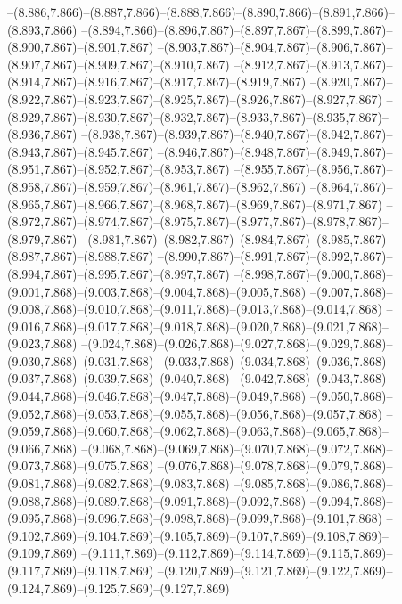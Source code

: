   --(8.886,7.866)--(8.887,7.866)--(8.888,7.866)--(8.890,7.866)--(8.891,7.866)--(8.893,7.866)%
  --(8.894,7.866)--(8.896,7.867)--(8.897,7.867)--(8.899,7.867)--(8.900,7.867)--(8.901,7.867)%
  --(8.903,7.867)--(8.904,7.867)--(8.906,7.867)--(8.907,7.867)--(8.909,7.867)--(8.910,7.867)%
  --(8.912,7.867)--(8.913,7.867)--(8.914,7.867)--(8.916,7.867)--(8.917,7.867)--(8.919,7.867)%
  --(8.920,7.867)--(8.922,7.867)--(8.923,7.867)--(8.925,7.867)--(8.926,7.867)--(8.927,7.867)%
  --(8.929,7.867)--(8.930,7.867)--(8.932,7.867)--(8.933,7.867)--(8.935,7.867)--(8.936,7.867)%
  --(8.938,7.867)--(8.939,7.867)--(8.940,7.867)--(8.942,7.867)--(8.943,7.867)--(8.945,7.867)%
  --(8.946,7.867)--(8.948,7.867)--(8.949,7.867)--(8.951,7.867)--(8.952,7.867)--(8.953,7.867)%
  --(8.955,7.867)--(8.956,7.867)--(8.958,7.867)--(8.959,7.867)--(8.961,7.867)--(8.962,7.867)%
  --(8.964,7.867)--(8.965,7.867)--(8.966,7.867)--(8.968,7.867)--(8.969,7.867)--(8.971,7.867)%
  --(8.972,7.867)--(8.974,7.867)--(8.975,7.867)--(8.977,7.867)--(8.978,7.867)--(8.979,7.867)%
  --(8.981,7.867)--(8.982,7.867)--(8.984,7.867)--(8.985,7.867)--(8.987,7.867)--(8.988,7.867)%
  --(8.990,7.867)--(8.991,7.867)--(8.992,7.867)--(8.994,7.867)--(8.995,7.867)--(8.997,7.867)%
  --(8.998,7.867)--(9.000,7.868)--(9.001,7.868)--(9.003,7.868)--(9.004,7.868)--(9.005,7.868)%
  --(9.007,7.868)--(9.008,7.868)--(9.010,7.868)--(9.011,7.868)--(9.013,7.868)--(9.014,7.868)%
  --(9.016,7.868)--(9.017,7.868)--(9.018,7.868)--(9.020,7.868)--(9.021,7.868)--(9.023,7.868)%
  --(9.024,7.868)--(9.026,7.868)--(9.027,7.868)--(9.029,7.868)--(9.030,7.868)--(9.031,7.868)%
  --(9.033,7.868)--(9.034,7.868)--(9.036,7.868)--(9.037,7.868)--(9.039,7.868)--(9.040,7.868)%
  --(9.042,7.868)--(9.043,7.868)--(9.044,7.868)--(9.046,7.868)--(9.047,7.868)--(9.049,7.868)%
  --(9.050,7.868)--(9.052,7.868)--(9.053,7.868)--(9.055,7.868)--(9.056,7.868)--(9.057,7.868)%
  --(9.059,7.868)--(9.060,7.868)--(9.062,7.868)--(9.063,7.868)--(9.065,7.868)--(9.066,7.868)%
  --(9.068,7.868)--(9.069,7.868)--(9.070,7.868)--(9.072,7.868)--(9.073,7.868)--(9.075,7.868)%
  --(9.076,7.868)--(9.078,7.868)--(9.079,7.868)--(9.081,7.868)--(9.082,7.868)--(9.083,7.868)%
  --(9.085,7.868)--(9.086,7.868)--(9.088,7.868)--(9.089,7.868)--(9.091,7.868)--(9.092,7.868)%
  --(9.094,7.868)--(9.095,7.868)--(9.096,7.868)--(9.098,7.868)--(9.099,7.868)--(9.101,7.868)%
  --(9.102,7.869)--(9.104,7.869)--(9.105,7.869)--(9.107,7.869)--(9.108,7.869)--(9.109,7.869)%
  --(9.111,7.869)--(9.112,7.869)--(9.114,7.869)--(9.115,7.869)--(9.117,7.869)--(9.118,7.869)%
  --(9.120,7.869)--(9.121,7.869)--(9.122,7.869)--(9.124,7.869)--(9.125,7.869)--(9.127,7.869)%
